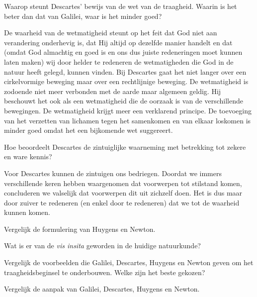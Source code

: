 \documentclass{ximera}
\begin{document}
\begin{exercise}
    \begin{question}  Waarop steunt Descartes' bewijs van de wet van de traagheid. Waarin is het beter dan dat van
	Galilei, waar is het minder goed?
	\begin{oplossing}
	De waarheid van de wetmatigheid steunt op het feit dat God niet aan verandering onderhevig is, dat Hij altijd op dezelfde manier handelt en dat (omdat God almachtig en goed is en ons dus juiste redeneringen moet kunnen laten maken) wij door helder te redeneren de wetmatigheden die God in de natuur heeft gelegd, kunnen vinden.
	Bij Descartes gaat het niet langer over een cirkelvormige beweging maar over een rechtlijnige beweging. De wetmatigheid is zodoende niet meer verbonden met de aarde maar algemeen geldig. Hij beschouwt het ook als een wetmatigheid die de oorzaak is van de verschillende bewegingen. De wetmatigheid krijgt meer een verklarend principe. De toevoeging van het verzetten van lichamen tegen het samenkomen en van elkaar loskomen is minder goed omdat het een bijkomende wet suggereert.
	\end{oplossing}
	\end{question}
	
    \begin{question}  Hoe beoordeelt Descartes de zintuiglijke waarneming met betrekking tot zekere en ware
	kennis?
	\begin{oplossing}
	Voor Descartes kunnen de zintuigen ons bedriegen. Doordat we immers verschillende keren hebben waargenomen dat voorwerpen tot stilstand komen, concluderen we valselijk dat voorwerpen dit uit zichzelf doen. Het is dus maar door zuiver te redeneren (en enkel door te redeneren) dat we tot de waarheid kunnen komen.
	\end{oplossing}
	\end{question}
	
    \begin{question}  Vergelijk de formulering van Huygens en Newton.
	\end{question}
    
	\begin{question}  Wat is er van de \textit{vis insita} geworden in de huidige natuurkunde?
	\end{question}
    
	\begin{question}  Vergelijk de voorbeelden die Galilei, Descartes, Huygens en Newton geven om het traagheidsbeginsel te onderbouwen. Welke zijn het beste gekozen?
	\end{question}
    
	\begin{question}  Vergelijk de aanpak van Galilei, Descartes, Huygens en Newton.
	\end{question}
	\end{exercise}
	\clearpage
	
	
\end{document}
